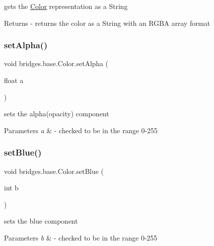 gets the \mbox{\hyperlink{classbridges_1_1base_1_1_color}{Color}} representation as a String

\begin{DoxyReturn}{Returns}
-\/ returns the color as a String with an R\+G\+BA array format 
\end{DoxyReturn}
\mbox{\label{classbridges_1_1base_1_1_color_afab07ce64efa1fa5797795670b0effb6}} 
\subsubsection{\texorpdfstring{setAlpha()}{setAlpha()}}
{\footnotesize\ttfamily void bridges.\+base.\+Color.\+set\+Alpha (\begin{DoxyParamCaption}\item[{float}]{a }\end{DoxyParamCaption})}

sets the alpha(opacity) component


\begin{DoxyParams}{Parameters}
{\em a} & -\/ checked to be in the range 0-\/255 \\
\hline
\end{DoxyParams}
\mbox{\label{classbridges_1_1base_1_1_color_a0e04156b1573cf8002c4d9cb69825657}} 
\subsubsection{\texorpdfstring{setBlue()}{setBlue()}}
{\footnotesize\ttfamily void bridges.\+base.\+Color.\+set\+Blue (\begin{DoxyParamCaption}\item[{int}]{b }\end{DoxyParamCaption})}

sets the blue component


\begin{DoxyParams}{Parameters}
{\em b} & -\/ checked to be in the range 0-\/255 \\
\hline
\end{DoxyParams}
\mbox{\label{classbridges_1_1base_1_1_color_a5559b1c7eb4c3901526b1012029b528f}} 
